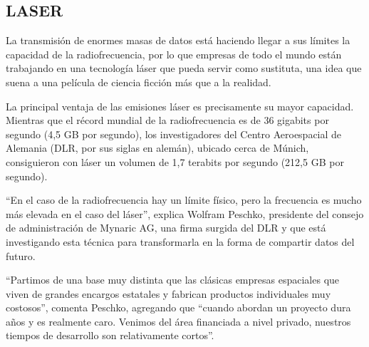 \documentclass[a4paper]{article}
\begin{document}
\noindent{}

\subsection{LASER}

La transmisión de enormes masas de datos está haciendo llegar a sus
límites la capacidad de la radiofrecuencia, por lo que empresas de todo
el mundo están trabajando en una tecnología láser que pueda servir como
sustituta, una idea que suena a una película de ciencia ficción más que
a la realidad.

La principal ventaja de las emisiones láser es precisamente su mayor
capacidad. Mientras que el récord mundial de la radiofrecuencia es de 36
gigabits por segundo (4,5 GB por segundo), los investigadores del Centro
Aeroespacial de Alemania (DLR, por sus siglas en alemán), ubicado cerca
de Múnich, consiguieron con láser un volumen de 1,7 terabits por segundo
(212,5 GB por segundo).

``En el caso de la radiofrecuencia hay un límite físico, pero la
frecuencia es mucho más elevada en el caso del láser'', explica Wolfram
Peschko, presidente del consejo de administración de Mynaric AG, una
firma surgida del DLR y que está investigando esta técnica para
transformarla en la forma de compartir datos del futuro.

``Partimos de una base muy distinta que las clásicas empresas espaciales
que viven de grandes encargos estatales y fabrican productos
individuales muy costosos'', comenta Peschko, agregando que ``cuando
abordan un proyecto dura años y es realmente caro. Venimos del área
financiada a nivel privado, nuestros tiempos de desarrollo son
relativamente cortos''.
\end{document}
